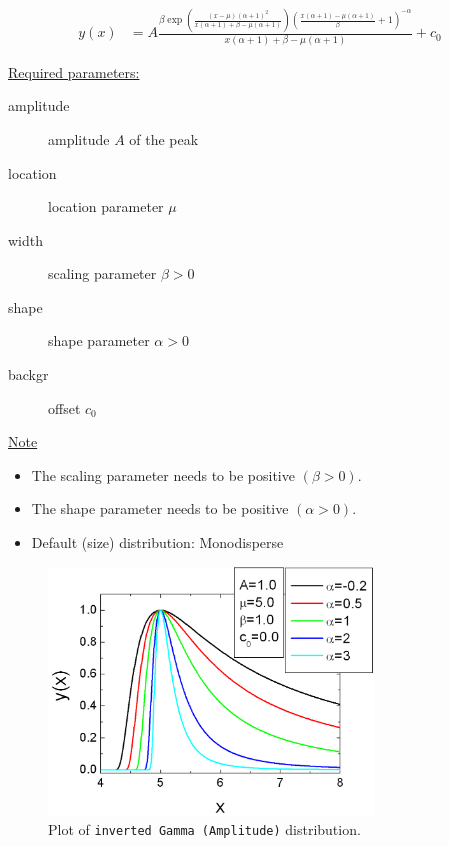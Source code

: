 \begin{align}
y(x) &= A\frac{\beta\exp\left(\frac{(x-\mu)(\alpha+1)^2}{x(\alpha+1)+\beta-\mu(\alpha+1)}\right)\left(\frac{x(\alpha+1)-\mu(\alpha+1)}{\beta}+1\right)^{-\alpha}}{x(\alpha+1)+\beta-\mu(\alpha+1)}
+c_0
\end{align}

\uline{Required parameters:}
\begin{description}
    \item[amplitude] amplitude $A$ of the peak
    \item[location] location parameter $\mu$
    \item[width] scaling parameter $\beta > 0$
    \item[shape] shape parameter $\alpha > 0$
    \item[backgr] offset $c_0$
\end{description}

\uline{Note}
\begin{itemize}
  \item The scaling parameter needs to be positive $(\beta > 0)$.
  \item The shape parameter needs to be positive $(\alpha > 0)$.
  \item Default (size) distribution: Monodisperse
\end{itemize}

\begin{figure}[htb]
\begin{center}
\includegraphics[width=0.768\textwidth]{invertedGammaAmplitude.png}
\end{center}
\caption{Plot of \texttt{inverted Gamma (Amplitude)} distribution.}
\label{fig:invertedGammaAmplitude}
\end{figure}

\clearpage

